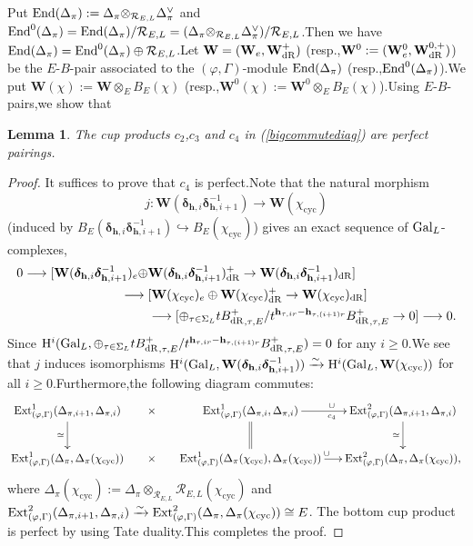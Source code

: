 \documentclass[SecEq,CM,GP]{degruyter-crelle} %
\theoremstyle{plain}
\newtheorem{lem}[thm]{Lemma}
\newcommand{\bdr}{{B^+_{\mathrm{dR}}}}
\newcommand{\ccyc}{{\chi_{\mathrm{cyc}}}}
\newcommand{\dr}{{\rm dR}}
\newcommand{\EndO}{{\rm End}}
\newcommand{\ext}{{\rm Ext}}
\newcommand{\gal}{{\rm Gal}}
\newcommand{\hH}{{\mathrm{H}}}
\newcommand{\hpi}{{{\mathbf{h}}}}
\newcommand{\tee}{{{\otimes}_{\cR_{E,L}}}}
\newcommand{\bW}{{\mathbf{W}}}
\newcommand{\bh}{{\mathbf{h}}}
\newcommand{\cR}{\mathcal R}
\begin{document}
Put $\EndO(\Delta_{\pi}):=\Delta_{\pi}\tee\Delta_{\pi}^\vee$ and $\EndO^0(\Delta_{\pi})=\EndO(\Delta_{\pi})/\cR_{E,L}=(\Delta_{\pi} \tee\Delta_{\pi}^\vee)/\cR_{E,L}$.\;Then we have $\EndO(\Delta_{\pi})=\EndO^0(\Delta_{\pi})\oplus \cR_{E,L}$.\;Let $\bW=(\bW_e,\bW_{\dr}^+)$ (resp.,$\bW^0:=(\bW_e^0,\bW_{\dr}^{0,+})$) be the $E$-$B$-pair associated to the $(\varphi,\Gamma)$-module $\EndO(\Delta_{\pi})$ (resp.,\;$\EndO^0({\Delta_\pi})$).\;We put $\bW(\chi):=\bW\otimes_EB_E(\chi)$ (resp.,\;$\bW^0(\chi):=\bW^0\otimes_EB_E(\chi)$).\;Using $E$-$B$-pairs,\;we show that
\begin{lem}\label{lembigcommutediag}
The cup products $c_2$,\;$c_3$ and $c_4$ in (\ref{bigcommutediag}) are perfect pairings.\;
\end{lem}
\begin{proof}It suffices to prove that $c_4$ is perfect.\;Note that the natural morphism $$j:\bW(\bm{\delta}_{\bh,i}\bm{\delta}_{\bh,i+1}^{-1})\rightarrow \bW(\ccyc)$$ (induced by $B_E(\bm{\delta}_{\bh,i}\bm{\delta}_{\bh,i+1}^{-1})\hookrightarrow B_E(\ccyc)$) gives an exact sequence of $\gal_L$-complexes,\;
\begin{equation*}
	\begin{aligned}
		0\longrightarrow [\bW(\bm{\delta}_{\bh,i}\bm{\delta}_{\bh,i+1}^{-1})_e\oplus& \bW(\bm{\delta}_{\bh,i}\bm{\delta}_{\bh,i+1}^{-1})^+_{\dr}\rightarrow \bW(\bm{\delta}_{\bh,i}\bm{\delta}_{\bh,i+1}^{-1})_{\dr}]\\
		\longrightarrow \;& [\bW(\ccyc)_e\oplus \bW(\ccyc)^+_{\dr}\rightarrow \bW(\ccyc)_{\dr}]\\
		&\longrightarrow [\oplus_{\tau\in\Sigma_L}t\bdr_{,\tau,E}/t^{\hpi_{\tau,ir}-\hpi_{\tau,(i+1)r}}\bdr_{,\tau,E}\rightarrow0]\longrightarrow 0.\\
	\end{aligned}
\end{equation*}
Since $\hH^i(\gal_L,\oplus_{\tau\in\Sigma_L}t\bdr_{,\tau,E}/t^{\hpi_{\tau,ir}-\hpi_{\tau,(i+1)r}}\bdr_{,\tau,E})=0$ for any $i\geq 0$.\;We see that $j$ induces isomorphisms $\hH^i(\gal_L,\bW(\bm{\delta}_{\bh,i}\bm{\delta}_{\bh,i+1}^{-1}))\xrightarrow{\sim}\hH^i(\gal_L,\bW(\ccyc))$ for all $i\geq 0$.\;Furthermore,\;the following diagram commutes:
\[\xymatrix@C=3.5ex{
	\ext^1_{(\varphi,\Gamma)}(\Delta_{\pi,i+1},\Delta_{\pi,i}) \ar[d]_{\simeq}  & \times & \ext^1_{(\varphi,\Gamma)}(\Delta_{\pi,i},\Delta_{\pi,i}) \ar@{=}[d] \ar[r]^{\hspace{9pt}\cup}_{\hspace{9pt}c_4} & \ext^2_{(\varphi,\Gamma)}(\Delta_{\pi,i+1},\Delta_{\pi,i}) \ar[d]_{\simeq}\\
	\ext^1_{(\varphi,\Gamma)}(\Delta_{\pi},\Delta_{\pi}(\ccyc))   & \times & \ext^1_{(\varphi,\Gamma)}(\Delta_{\pi}(\ccyc),\Delta_{\pi}(\ccyc))\ar[r]^{\cup} & \ext^2_{(\varphi,\Gamma)}(\Delta_{\pi},\Delta_{\pi}(\ccyc)) ,}\]
where $\Delta_{\pi}(\ccyc):=\Delta_{\pi}\tee\cR_{E,L}(\ccyc)$ and $\ext^2_{(\varphi,\Gamma)}(\Delta_{\pi,i+1},\Delta_{\pi,i})\xrightarrow{\sim}\ext^2_{(\varphi,\Gamma)}(\Delta_{\pi},\Delta_{\pi}(\ccyc))\cong E$. The bottom cup product is perfect by using Tate duality.\;This completes the proof.\;
\end{proof}
\end{document}
